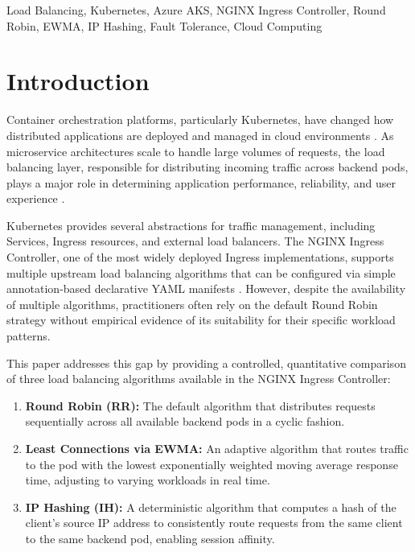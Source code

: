 \documentclass[conference]{IEEEtran}
\begin{document}
\begin{IEEEkeywords}
Load Balancing, Kubernetes, Azure AKS, NGINX Ingress Controller, Round Robin, EWMA, IP Hashing, Fault Tolerance, Cloud Computing
\end{IEEEkeywords}

\section{Introduction}

Container orchestration platforms, particularly Kubernetes, have changed how distributed applications are deployed and managed in cloud environments \cite{burns2016borg}. As microservice architectures scale to handle large volumes of requests, the load balancing layer, responsible for distributing incoming traffic across backend pods, plays a major role in determining application performance, reliability, and user experience \cite{gandhi2014autoscale}.

Kubernetes provides several abstractions for traffic management, including Services, Ingress resources, and external load balancers. The NGINX Ingress Controller, one of the most widely deployed Ingress implementations, supports multiple upstream load balancing algorithms that can be configured via simple annotation-based declarative YAML manifests \cite{nginx_ingress_docs}. However, despite the availability of multiple algorithms, practitioners often rely on the default Round Robin strategy without empirical evidence of its suitability for their specific workload patterns.

This paper addresses this gap by providing a controlled, quantitative comparison of three load balancing algorithms available in the NGINX Ingress Controller:

\begin{enumerate}
    \item \textbf{Round Robin (RR):} The default algorithm that distributes requests sequentially across all available backend pods in a cyclic fashion.
    \item \textbf{Least Connections via EWMA:} An adaptive algorithm that routes traffic to the pod with the lowest exponentially weighted moving average response time, adjusting to varying workloads in real time.
    \item \textbf{IP Hashing (IH):} A deterministic algorithm that computes a hash of the client's source IP address to consistently route requests from the same client to the same backend pod, enabling session affinity.
\end{enumerate}
\end{document}
